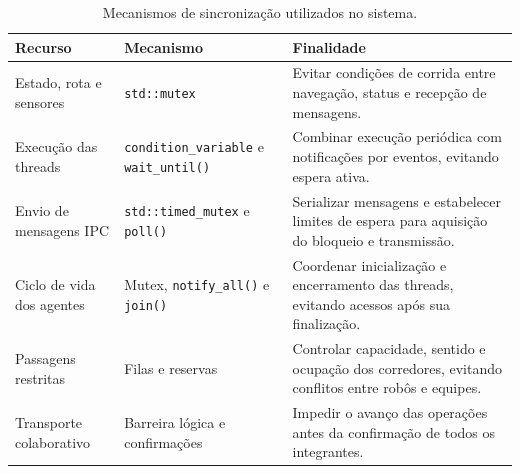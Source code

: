 \documentclass[12pt,a4paper]{article}
\newcommand{\code}[1]{\mbox{\texttt{#1}}}
\begin{document}
\begin{table}[H]
    \centering
    \scriptsize
    \caption{Mecanismos de sincronização utilizados no sistema.}
    \label{tab:sync}

    \begingroup
    \renewcommand{\arraystretch}{1.8}

    \begin{tabularx}{\textwidth}{@{}p{2.8cm}p{3.0cm}Y@{}}
        \toprule
        \textbf{Recurso}          & \textbf{Mecanismo}                                & \textbf{Finalidade}                       \\
        \midrule

        Estado, rota e sensores   & \code{std::mutex}                                 & Evitar condições de corrida entre
        navegação, status e recepção de mensagens.                                                                                \\

        Execução das threads      & \code{condition\_variable} e \code{wait\_until()} &
        Combinar execução periódica com notificações por eventos, evitando espera
        ativa.                                                                                                                    \\

        Envio de mensagens IPC    & \code{std::timed\_mutex} e \code{poll()}          & Serializar
        mensagens e estabelecer limites de espera para aquisição do bloqueio e
        transmissão.                                                                                                              \\

        Ciclo de vida dos agentes & Mutex, \code{notify\_all()} e \code{join()}       &
        Coordenar inicialização e encerramento das threads, evitando acessos após sua
        finalização.                                                                                                              \\

        Passagens restritas       & Filas e reservas                                  & Controlar capacidade, sentido e
        ocupação dos corredores, evitando conflitos entre robôs e equipes.                                                        \\

        Transporte colaborativo   & Barreira lógica e confirmações                    & Impedir o avanço das
        operações antes da confirmação de todos os integrantes.                                                                   \\


\end{tabularx}
\end{table}
\end{document}
